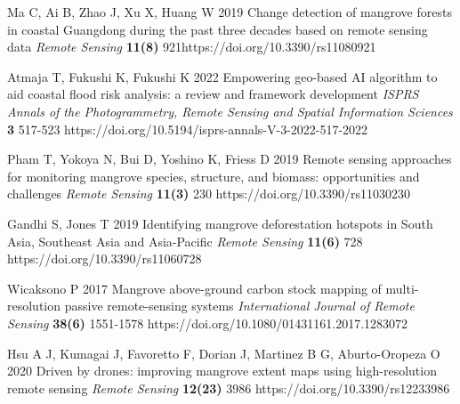 \documentclass[a4paper]{jpconf}
\begin{document}
\begin{thebibliography}{9}
 Ma C, Ai B, Zhao J, Xu X, Huang W 2019 Change detection of mangrove forests in coastal Guangdong during the past three decades based on remote sensing data \emph{Remote Sensing} \textbf{11(8)} 921https://doi.org/10.3390/rs11080921

 Atmaja T, Fukushi K, Fukushi K 2022 Empowering geo-based AI algorithm to aid coastal flood risk analysis: a review and framework development \emph{ISPRS Annals of the Photogrammetry, Remote Sensing and Spatial Information Sciences} \textbf{3} 517-523 https://doi.org/10.5194/isprs-annals-V-3-2022-517-2022

 Pham T, Yokoya N, Bui D, Yoshino K, Friess D 2019 Remote sensing approaches for monitoring mangrove species, structure, and biomass: opportunities and challenges \emph{Remote Sensing} \textbf{11(3)} 230 https://doi.org/10.3390/rs11030230

 Gandhi S, Jones T 2019 Identifying mangrove deforestation hotspots in South Asia, Southeast Asia and
Asia-Pacific \emph{Remote Sensing} \textbf{11(6)} 728 https://doi.org/10.3390/rs11060728

 Wicaksono P 2017 Mangrove above-ground carbon stock mapping of multi-resolution passive remote-sensing systems \emph{International Journal of Remote Sensing} \textbf{38(6)} 1551-1578 https://doi.org/10.1080/01431161.2017.1283072

 Hsu A J, Kumagai J, Favoretto F, Dorian J, Martinez B G, Aburto-Oropeza O 2020 Driven by drones: improving mangrove extent maps using high-resolution remote sensing \emph{Remote Sensing} \textbf{12(23)} 3986 https://doi.org/10.3390/rs12233986

\end{thebibliography}
\end{document}
